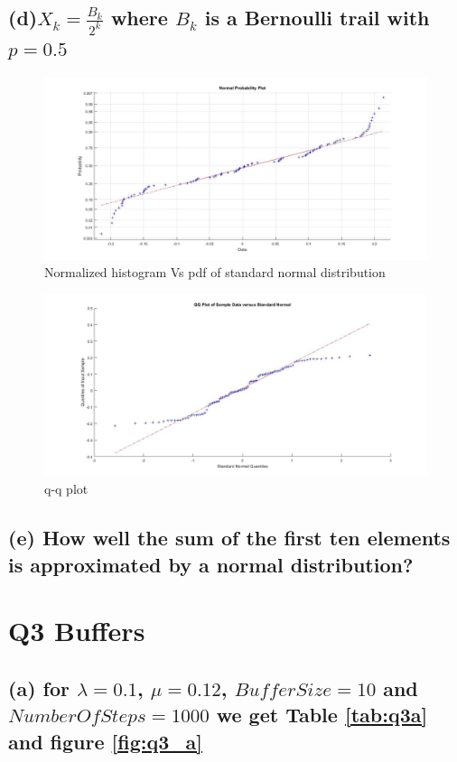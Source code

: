 \documentclass[a4paper,11pt]{article}
\begin{document}
\subsection*{(d)\quad $X_k=\frac{B_k}{2^k}$  where $B_k$ is a Bernoulli trail with $p=0.5$}
\begin{figure}[h]
   \hspace*{-4cm}
    \includegraphics[scale=0.4]{q2_d_1}
    \caption{Normalized histogram Vs pdf of standard normal distribution}\label{fig:q2_d_1}
\end{figure}
\begin{figure}[h]
   \hspace*{-4cm}
    \includegraphics[scale=0.4]{q2_d_2}
    \caption{q-q plot}\label{fig:q2_d_2}
\end{figure}
\subsection*{(e) How well the sum of the first ten elements is approximated by a normal distribution?}
\newpage
\clearpage
\section*{Q3 \quad Buffers}

\subsection*{(a) for $\lambda = 0.1$, $\mu=0.12$, $BufferSize=10$ and $NumberOf Steps=1000$ we get Table \ref{tab:q3a} and figure \ref{fig:q3_a} }
\end{document}
